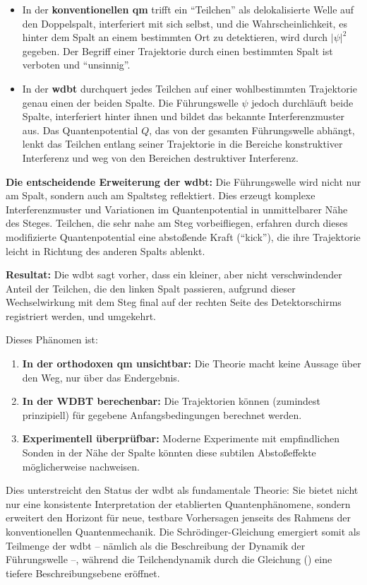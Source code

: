 \begin{itemize}
    \item In der \textbf{konventionellen \gls{qm}} trifft ein \enquote{Teilchen} als delokalisierte Welle auf den Doppelspalt, interferiert mit sich selbst, und die Wahrscheinlichkeit, es hinter dem Spalt an einem bestimmten Ort zu detektieren, wird durch $\left| \psi \right|^2$ gegeben. Der Begriff einer Trajektorie durch einen bestimmten Spalt ist verboten und \enquote{unsinnig}.
    \item In der \textbf{\gls{wdbt}} durchquert jedes Teilchen auf einer wohlbestimmten Trajektorie genau einen der beiden Spalte. Die Führungswelle $\psi$ jedoch durchläuft beide Spalte, interferiert hinter ihnen und bildet das bekannte Interferenzmuster aus. Das Quantenpotential $Q$, das von der gesamten Führungswelle abhängt, lenkt das Teilchen entlang seiner Trajektorie in die Bereiche konstruktiver Interferenz und weg von den Bereichen destruktiver Interferenz.
\end{itemize}

\textbf{Die entscheidende Erweiterung der \gls{wdbt}:} Die Führungswelle wird nicht nur am Spalt, sondern auch am Spaltsteg reflektiert. Dies erzeugt komplexe Interferenzmuster und Variationen im
Quantenpotential in unmittelbarer Nähe des Steges. Teilchen, die sehr nahe am Steg vorbeifliegen, erfahren durch dieses modifizierte Quantenpotential eine abstoßende Kraft (\enquote{kick}), die ihre
Trajektorie leicht in Richtung des anderen Spalts ablenkt.

\textbf{Resultat:} Die \gls{wdbt} sagt vorher, dass ein kleiner, aber nicht verschwindender Anteil der Teilchen, die den linken Spalt passieren, aufgrund dieser Wechselwirkung mit dem Steg final auf
der rechten Seite des Detektorschirms registriert werden, und umgekehrt.

Dieses Phänomen ist:

\begin{enumerate}
    \item \textbf{In der orthodoxen \gls{qm} unsichtbar:} Die Theorie macht keine Aussage über den Weg, nur über das Endergebnis.
    \item \textbf{In der WDBT berechenbar:} Die Trajektorien können (zumindest prinzipiell) für gegebene Anfangsbedingungen berechnet werden.
    \item \textbf{Experimentell überprüfbar:} Moderne Experimente mit empfindlichen Sonden in der Nähe der Spalte könnten diese subtilen Abstoßeffekte möglicherweise nachweisen.
\end{enumerate}

Dies unterstreicht den Status der \gls{wdbt} als fundamentale Theorie: Sie bietet nicht nur eine konsistente Interpretation der etablierten Quantenphänomene, sondern erweitert den Horizont für neue,
testbare Vorhersagen jenseits des Rahmens der konventionellen Quantenmechanik. Die Schrödinger-Gleichung emergiert somit als Teilmenge der \gls{wdbt} – nämlich als die Beschreibung der Dynamik der
Führungswelle –, während die Teilchendynamik durch die Gleichung () eine tiefere Beschreibungsebene eröffnet.
